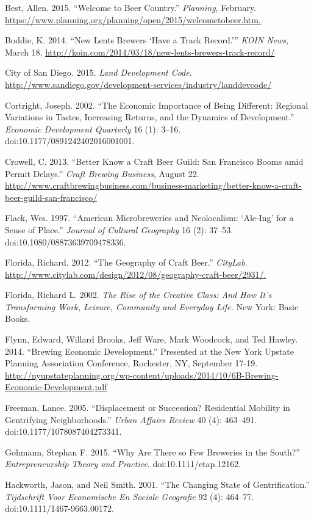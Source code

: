 \documentclass[]{article}
\begin{document}
Best, Allen. 2015. ``Welcome to Beer Country.'' \emph{Planning},
February. \url{https://www.planning.org/planning/open/2015/welcometobeer.htm.}

Boddie, K. 2014. ``New Lents Brewers `Have a Track Record.''' \emph{KOIN
News}, March 18.
\url{http://koin.com/2014/03/18/new-lents-brewers-track-record/}

City of San Diego. 2015. \emph{Land Development Code}.
\url{http://www.sandiego.gov/development-services/industry/landdevcode/}

Cortright, Joseph. 2002. ``The Economic Importance of Being Different:
Regional Variations in Tastes, Increasing Returns, and the Dynamics of
Development.'' \emph{Economic Development Quarterly} 16 (1): 3--16.
doi:10.1177/0891242402016001001.

Crowell, C. 2013. ``Better Know a Craft Beer Guild: San Francisco Booms
amid Permit Delays.'' \emph{Craft Brewing Business}, August 22.
\url{http://www.craftbrewingbusiness.com/business-marketing/better-know-a-craft-beer-guild-san-francisco/}

Flack, Wes. 1997. ``American Microbreweries and Neolocalism: `Ale-Ing'
for a Sense of Place.'' \emph{Journal of Cultural Geography} 16 (2):
37--53. doi:10.1080/08873639709478336.

Florida, Richard. 2012. ``The Geography of Craft Beer.'' \emph{CityLab}.
\url{http://www.citylab.com/design/2012/08/geography-craft-beer/2931/.}

Florida, Richard L. 2002. \emph{The Rise of the Creative Class: And How
It's Transforming Work, Leisure, Community and Everyday Life.} New York:
Basic Books.

Flynn, Edward, Willard Brooks, Jeff Ware, Mark Woodcock, and Ted Hawley.
2014. ``Brewing Economic Development.'' Presented at the New York
Upstate Planning Association Conference, Rochester, NY, September 17-19.
\url{http://nyupstateplanning.org/wp-content/uploads/2014/10/6B-Brewing-Economic-Development.pdf}

Freeman, Lance. 2005. ``Displacement or Succession? Residential Mobility in Gentrifying Neighborhoods.'' \emph{Urban Affairs Review} 40 (4): 463--491. doi:10.1177/1078087404273341.

Gohmann, Stephan F. 2015. ``Why Are There so Few Breweries in the
South?'' \emph{Entrepreneurship Theory and Practice}.
doi:10.1111/etap.12162.

Hackworth, Jason, and Neil Smith. 2001. ``The Changing State of
Gentrification.'' \emph{Tijdschrift Voor Economische En Sociale
Geografie} 92 (4): 464--77. doi:10.1111/1467-9663.00172.
\end{document}
